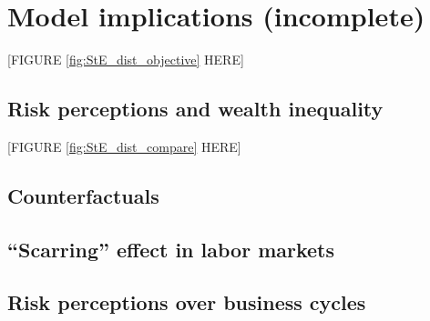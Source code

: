 \hypertarget{experiments}{%
\section{Model implications (incomplete)}\label{experiments}}


\begin{center}
[FIGURE \ref{fig:StE_dist_objective} HERE]
\end{center}

\subsection{Risk perceptions and wealth inequality}



\begin{center}
[FIGURE \ref{fig:StE_dist_compare} HERE]
\end{center}



\subsection{Counterfactuals }

\subsection{``Scarring'' effect in labor markets}

\subsection{Risk perceptions over business cycles}


